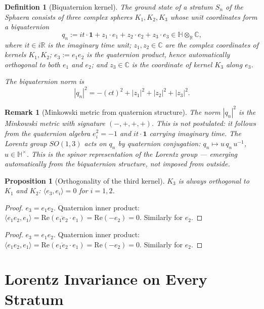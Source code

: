 \documentclass[12pt,a4paper]{article}
\newtheorem{proposition}[theorem]{Proposition}
\newtheorem{definition}[theorem]{Definition}
\newtheorem*{remark}{Remark}
\newcommand{\HH}{\mathbb{H}}
\begin{document}
\begin{definition}[Biquaternion kernel]\label{def:biquaternion}
The ground state of a stratum $S_n$ of the Sphaera consists of three
complex spheres $K_1,K_2,K_3$ whose unit coordinates form a biquaternion
\[
  q_n := it\cdot\mathbf{1} + z_1\cdot e_1 + z_2\cdot e_2
         + z_3\cdot e_3 \in \HH\otimes_{\mathbb{R}}\mathbb{C},
\]
where $it\in i\mathbb{R}$ is the imaginary time unit;
$z_1,z_2\in\mathbb{C}$ are the complex coordinates of kernels $K_1,K_2$;
$e_3:=e_1 e_2$ is the quaternion product, hence automatically orthogonal
to both $e_1$ and $e_2$;
and $z_3\in\mathbb{C}$ is the coordinate of kernel $K_3$ along $e_3$.

The biquaternion norm is
\[
  |q_n|^2 = -(ct)^2 + |z_1|^2 + |z_2|^2 + |z_3|^2.
\]
\end{definition}

\begin{remark}[Minkowski metric from quaternion structure]
The norm $|q_n|^2$ is the Minkowski metric with signature $(-,+,+,+)$.
This is not postulated: it follows from the quaternion algebra $e_i^2=-1$
and $it\cdot\mathbf{1}$ carrying imaginary time.
The Lorentz group $SO(1,3)$ acts on $q_n$ by quaternion conjugation:
$q_n\mapsto u\,q_n\,u^{-1}$, $u\in\HH^\times$.
This is the spinor representation of the Lorentz group --- emerging
automatically from the biquaternion structure, not imposed from outside.
\end{remark}

\begin{proposition}[Orthogonality of the third kernel]
$K_3$ is always orthogonal to $K_1$ and $K_2$:
$\langle e_3,e_i\rangle=0$ for $i=1,2$.
\end{proposition}

\begin{proof}
$e_3=e_1 e_2$. Quaternion inner product:
$\langle e_1 e_2,e_1\rangle = \mathrm{Re}(\overline{e_1 e_2}\cdot e_1)
= \mathrm{Re}(-e_2) = 0$.
Similarly for $e_2$.
\end{proof}

\begin{proof}
$e_3=e_1 e_2$. Quaternion inner product:
$\langle e_1 e_2,e_1\rangle = \mathrm{Re}(\overline{e_1 e_2}\cdot e_1)
= \mathrm{Re}(-e_2) = 0$.
Similarly for $e_2$.
\end{proof}


\section{Lorentz Invariance on Every Stratum}
\label{sec:lorentz}
\end{document}
